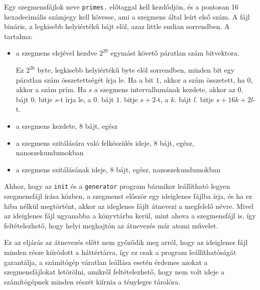 Egy szegmensfájlok neve \texttt{primes.} előtaggal kell kezdődjön, és a pontosan 16 hexadecimális számjegy kell kövesse, ami a szegmens által leírt első szám.
A fájl bináris, a legkisebb helyiértékű bájt elöl, azaz little endian sorrendben.
A tartalma:
\begin{itemize}
\item a szegmens elejével kezdve $2^{29}$ egymást követő páratlan szám bitvektora.
	
Ez $2^{26}$ byte, legkisebb helyiértékű byte elöl sorrendben, minden bit egy páratlan szám összetettségét írja le.
Ha a bit $1$, akkor a szám összetett, ha $0$, akkor a szám prím.
Ha $s$ a szegmens intervallumának kezdete, akkor az $0.$ bájt $0.$ bitje $s$-t írja le, a $0.$ bájt $1.$ bitje $s+2$-t, a $k.$ bájt $l.$ bitje $s+16k+2l$-t.
	
\item a szegmens kezdete, 8 bájt, egész
\item a szegmens szitálására való felkészülés ideje, 8 bájt, egész, nanoszekundumokban
\item a szegmens szitálásának ideje, 8 bájt, egész, nanoszekundumokban
\end{itemize}

Ahhoz, hogy az \texttt{init} és a \texttt{generator} program bármikor leállítható legyen szegmensfájl írása közben, a szegmenst először egy ideiglenes fájlba írja, és ha ez hiba nélkül megtörtént, akkor az ideglenes fájlt átnevezi a megfelelő névre.
Mivel az ideiglenes fájl ugyanabba a könyvtárba kerül, mint ahova a szegmensfájl is, így feltételezhető, hogy helyi meghajtón az átnevezés már atomi művelet.

Ez az eljárás az átnevezés előtt nem győződik meg arról, hogy az ideiglenes fájl minden része
kiíródott a háttértárra, így ez csak a program leállíthatóságát garantálja, a számítógép váratlan leállása esetén érdemes azokat a szegmensfájlokat letörölni, amikről feltételezhető, hogy nem volt ideje a számítógépnek minden részét kiírnia a tényleges tárolóra.

